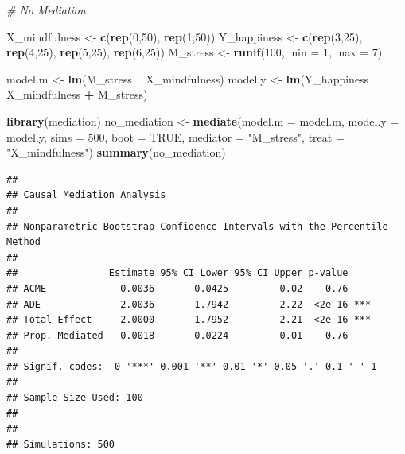 \documentclass[]{book}
\newenvironment{Shaded}{\begin{snugshade}}{\end{snugshade}}
\newcommand{\CommentTok}[1]{\textcolor[rgb]{0.56,0.35,0.01}{\textit{#1}}}
\newcommand{\DataTypeTok}[1]{\textcolor[rgb]{0.13,0.29,0.53}{#1}}
\newcommand{\DecValTok}[1]{\textcolor[rgb]{0.00,0.00,0.81}{#1}}
\newcommand{\KeywordTok}[1]{\textcolor[rgb]{0.13,0.29,0.53}{\textbf{#1}}}
\newcommand{\NormalTok}[1]{#1}
\newcommand{\OperatorTok}[1]{\textcolor[rgb]{0.81,0.36,0.00}{\textbf{#1}}}
\newcommand{\OtherTok}[1]{\textcolor[rgb]{0.56,0.35,0.01}{#1}}
\newcommand{\StringTok}[1]{\textcolor[rgb]{0.31,0.60,0.02}{#1}}
\begin{document}
\begin{Shaded}
\begin{Highlighting}[]
\CommentTok{# No Mediation}

\NormalTok{X_mindfulness <-}\StringTok{ }\KeywordTok{c}\NormalTok{(}\KeywordTok{rep}\NormalTok{(}\DecValTok{0}\NormalTok{,}\DecValTok{50}\NormalTok{), }\KeywordTok{rep}\NormalTok{(}\DecValTok{1}\NormalTok{,}\DecValTok{50}\NormalTok{))}
\NormalTok{Y_happiness <-}\StringTok{ }\KeywordTok{c}\NormalTok{(}\KeywordTok{rep}\NormalTok{(}\DecValTok{3}\NormalTok{,}\DecValTok{25}\NormalTok{), }\KeywordTok{rep}\NormalTok{(}\DecValTok{4}\NormalTok{,}\DecValTok{25}\NormalTok{), }\KeywordTok{rep}\NormalTok{(}\DecValTok{5}\NormalTok{,}\DecValTok{25}\NormalTok{), }\KeywordTok{rep}\NormalTok{(}\DecValTok{6}\NormalTok{,}\DecValTok{25}\NormalTok{))}
\NormalTok{M_stress  <-}\StringTok{ }\KeywordTok{runif}\NormalTok{(}\DecValTok{100}\NormalTok{, }\DataTypeTok{min =} \DecValTok{1}\NormalTok{, }\DataTypeTok{max =} \DecValTok{7}\NormalTok{)}

\NormalTok{model.m <-}\StringTok{ }\KeywordTok{lm}\NormalTok{(M_stress }\OperatorTok{~}\StringTok{ }\NormalTok{X_mindfulness)}
\NormalTok{model.y <-}\StringTok{ }\KeywordTok{lm}\NormalTok{(Y_happiness }\OperatorTok{~}\StringTok{ }\NormalTok{X_mindfulness }\OperatorTok{+}\StringTok{ }\NormalTok{M_stress)}

\KeywordTok{library}\NormalTok{(mediation)}
\NormalTok{no_mediation <-}\StringTok{ }\KeywordTok{mediate}\NormalTok{(}\DataTypeTok{model.m =}\NormalTok{ model.m,}
                       \DataTypeTok{model.y =}\NormalTok{ model.y,}
                       \DataTypeTok{sims =} \DecValTok{500}\NormalTok{,}
                       \DataTypeTok{boot =} \OtherTok{TRUE}\NormalTok{,}
                       \DataTypeTok{mediator =} \StringTok{"M_stress"}\NormalTok{,}
                       \DataTypeTok{treat =} \StringTok{"X_mindfulness"}\NormalTok{)}
\KeywordTok{summary}\NormalTok{(no_mediation)}
\end{Highlighting}
\end{Shaded}

\begin{verbatim}
## 
## Causal Mediation Analysis 
## 
## Nonparametric Bootstrap Confidence Intervals with the Percentile Method
## 
##                Estimate 95% CI Lower 95% CI Upper p-value    
## ACME            -0.0036      -0.0425         0.02    0.76    
## ADE              2.0036       1.7942         2.22  <2e-16 ***
## Total Effect     2.0000       1.7952         2.21  <2e-16 ***
## Prop. Mediated  -0.0018      -0.0224         0.01    0.76    
## ---
## Signif. codes:  0 '***' 0.001 '**' 0.01 '*' 0.05 '.' 0.1 ' ' 1
## 
## Sample Size Used: 100 
## 
## 
## Simulations: 500
\end{verbatim}
\end{document}
